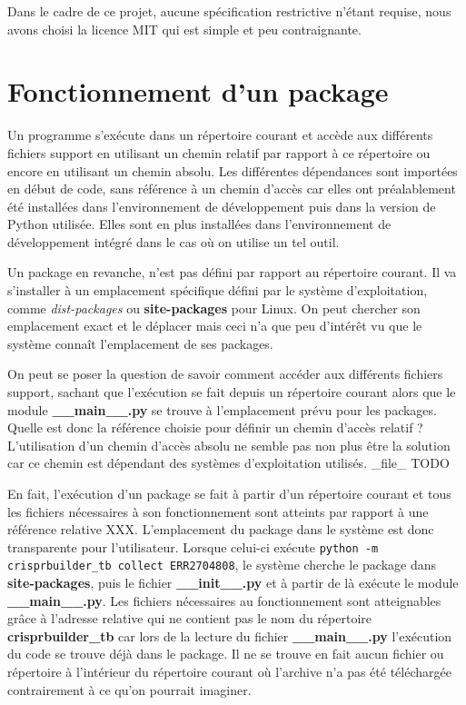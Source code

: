 \documentclass[twoside,a4paper,11pt,frenchb,openany]{report}
\begin{document}
Dans le cadre de ce projet, aucune spécification restrictive n'étant requise, nous avons choisi la licence MIT qui est simple et peu contraignante.




\section{Fonctionnement d'un package}

Un programme s'exécute dans un répertoire courant et accède aux différents fichiers support en utilisant un chemin relatif par rapport à ce répertoire ou encore en utilisant un chemin absolu. Les différentes dépendances sont importées en début de code, sans référence à un chemin d'accès car elles ont préalablement été installées dans l'environnement de développement puis dans la version de Python utilisée. Elles sont en plus installées dans l'environnement de développement intégré dans le cas où on utilise un tel outil.

Un package en revanche, n'est pas défini par rapport au répertoire courant. Il va s'installer à un emplacement spécifique défini par le système d'exploitation, comme \textit{dist-packages} ou \textbf{site-packages} pour Linux. On peut chercher son emplacement exact et  le déplacer mais ceci n'a que peu d'intérêt vu que le système connaît l'emplacement de ses packages.

On peut se poser la question de savoir comment accéder aux différents fichiers support, sachant que l'exécution se fait depuis un répertoire courant alors que le module \textbf{\_\_main\_\_.py} se trouve à l'emplacement prévu pour les packages. Quelle est donc la référence choisie pour définir un chemin d'accès relatif ? L'utilisation d'un chemin d'accès absolu ne semble pas non plus être la solution car ce chemin est dépendant des systèmes d'exploitation utilisés. \_file\_ TODO

En fait, l'exécution d'un package se fait à partir d'un répertoire courant et tous les fichiers nécessaires à son fonctionnement sont atteints par rapport à une référence relative XXX. L'emplacement du package dans le système est donc transparente pour l'utilisateur. Lorsque celui-ci exécute \texttt{python -m crisprbuilder\_tb \textemdash \textemdash collect ERR2704808}, le système cherche le package dans \textbf{site-packages}, puis le fichier \textbf{\_\_init\_\_.py} et à partir de là exécute le module \textbf{\_\_main\_\_.py}. Les fichiers nécessaires au fonctionnement sont atteignables grâce à l'adresse relative qui ne contient pas le nom du répertoire \textbf{crisprbuilder\_tb} car lors de la lecture du fichier \textbf{\_\_main\_\_.py} l'exécution du code se trouve déjà dans le package. Il ne se trouve en fait aucun fichier ou répertoire à l'intérieur du répertoire courant où l'archive n'a pas été téléchargée contrairement à ce qu'on pourrait imaginer.
\end{document}
